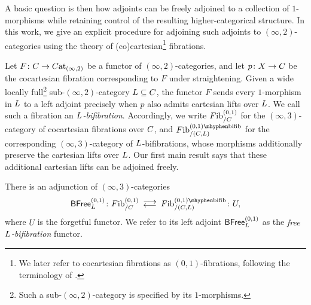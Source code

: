 \documentclass[a4paper,reqno,twoside]{amsart}
\begin{document}
A basic question is then how adjoints can be freely adjoined to a collection of $1$-morphisms while retaining control of the resulting higher-categorical structure. In this work, we give an explicit procedure for adjoining such adjoints to $(\infty,2)$-categories using the theory of (co)cartesian\footnote{We later refer to cocartesian fibrations as $(0,1)$-fibrations, following the terminology of \cite{AbellanGagnaea2025StraighteningLaxTransformations,AHM26}.} fibrations.

Let $F \colon \relax{C} \to \relax{C}\mathrm{at}_{(\infty,2)}$ be a functor of $(\infty,2)$-categories, and let $p \colon \relax{X} \to \relax{C}$ be the cocartesian fibration corresponding to $F$ under straightening. Given a wide locally full\footnote{Such a sub-$(\infty,2)$-category is specified by its $1$-morphisms.} sub-$(\infty,2)$-category $\relax{L} \subseteq \relax{C}$, the functor $F$ sends every $1$-morphism in $\relax{L}$ to a left adjoint precisely when $p$ also admits cartesian lifts over $\relax{L}$. We call such a fibration an \emph{$\relax{L}$-bifibration}. Accordingly, we write $\relax{F}\mathrm{ib}^{(0,1)}_{/\relax{C}}$ for the $(\infty,3)$-category of cocartesian fibrations over $\relax{C}$, and $\Fib_{/(\cC,\cL)}^{(0,1)\mhyphen\bifib}$ for the corresponding $(\infty,3)$-category of $\relax{L}$-bifibrations, whose morphisms additionally preserve the cartesian lifts over $\relax{L}$. Our first main result says that these additional cartesian lifts can be adjoined freely.

\begin{thmint}\label{thm:intro-freebifibration}
	There is an adjunction of $(\infty,3)$-categories
	\[
		\BFree^{(0,1)}_{\cL}\colon
		\Fib^{(0,1)}_{/\cC}
		\llra
		\Fib_{/(\cC,\cL)}^{(0,1)\mhyphen\bifib}
		\colon U,
	\]
	where $U$ is the forgetful functor. We refer to its left adjoint $\mathsf{BFree}^{(0,1)}_{\relax{L}}$ as the \emph{free $\relax{L}$-bifibration} functor.
\end{thmint}

\end{document}
